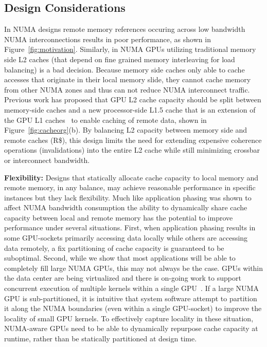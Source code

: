 \subsection{Design Considerations}
In NUMA designs remote memory references occuring across low bandwidth NUMA 
interconnections results in poor performance, as shown in 
Figure~\ref{fig:motivation}. Similarly, in NUMA GPUs utilizing
traditional memory side L2 caches (that depend on fine grained memory 
interleaving for load balancing) is a bad decision. Because memory side caches only
able to cache accesses that originate in their local memory slide, they cannot
cache memory from other NUMA zones and thus can not reduce NUMA interconnect traffic.  
Previous work has proposed that GPU L2 cache capacity should be split between 
memory-side caches and a new processor-side L1.5 cache that is an extension 
of the GPU L1 caches~\cite{Arunkumar2017} to enable caching of remote data, shown
in Figure~\ref{fig:cacheorg}(b). By balancing L2 capacity between memory side 
and remote caches (R\$), this design limits the need for extending expensive coherence
operations (invalidations) into the entire L2 cache while still 
minimizing crossbar or interconnect bandwidth.

\textbf{Flexibility:} Designs that statically allocate cache capacity to local memory and remote memory, 
in any balance, may achieve reasonable performance in specific instances 
but they lack flexibility. Much like application phasing was shown to affect 
NUMA bandwidth consumption the ability to dynamically share cache capacity between local and 
remote memory has the potential to improve performance under several 
situations. First, when application phasing results in some GPU-sockets
primarily accessing data locally while others are accessing data remotely,
a fix partitioning of cache capacity is guaranteed to be suboptimal.
Second, while 
we show that most applications will be able to completely fill large 
NUMA GPUs, this may not always be the case. GPUs within the data center are 
being virtualized and there is on-going work to support concurrent execution 
of multiple kernels within a single GPU~\cite{park2015chimera, 
lin2016enabling}. If a large NUMA GPU is sub-partitioned, it is intuitive 
that system software attempt to partition it along the NUMA boundaries (even within
a single GPU-socket) to improve the locality of small GPU kernels.
To effectively  capture locality in these situation, NUMA-aware GPUs need to be able to 
dynamically repurpose cache capacity at runtime, rather than be statically partitioned at design time. 

